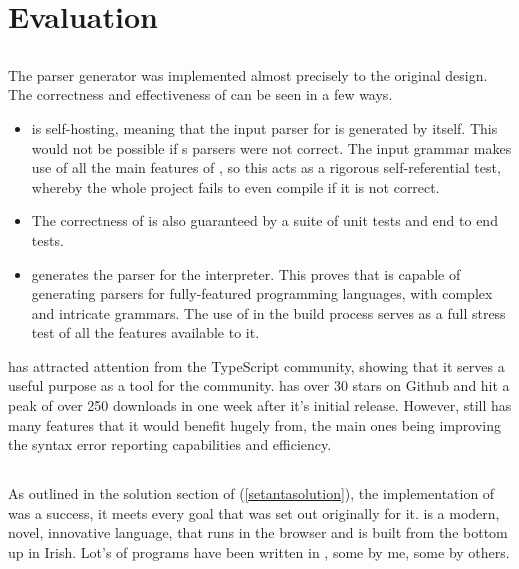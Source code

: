 \chapter{Evaluation}

\section{\tsPEG{}}

The \tsPEG{} parser generator was implemented almost precisely to the original design. The correctness and effectiveness of \tsPEG{} can be seen in a few ways.
\begin{itemize}
    \item \tsPEG{} is self-hosting, meaning that the input parser for \tsPEG{} is generated by \tsPEG{} itself. This would not be possible if \tsPEG{}s parsers were not correct. The input grammar makes use of all the main features of \tsPEG{}, so this acts as a rigorous self-referential test, whereby the whole project fails to even compile if it is not correct.
    \item The correctness of \tsPEG{} is also guaranteed by a suite of unit tests and end to end tests.
    \item \tsPEG{} generates the parser for the \Setanta{} interpreter. This proves that \tsPEG{} is capable of generating parsers for fully-featured programming languages, with complex and intricate grammars. The use of \tsPEG{} in the \Setanta{} build process serves as a full stress test of all the features available to it.
\end{itemize}

\tsPEG{} has attracted attention from the TypeScript community, showing that it serves a useful purpose as a tool for the community. \tsPEG{} has over 30 stars on Github and hit a peak of over 250 downloads in one week after it's initial release. However, \tsPEG{} still has many features that it would benefit hugely from, the main ones being improving the syntax error reporting capabilities and efficiency.

\section{\Setanta{}}

As outlined in the solution section of \Setanta{} (\ref{setantasolution}), the implementation of \Setanta{} was a success, it meets every goal that was set out originally for it. \Setanta{} is a modern, novel, innovative language, that runs in the browser and is built from the bottom up in Irish. Lot's of programs have been written in \Setanta{}, some by me, some by others.

